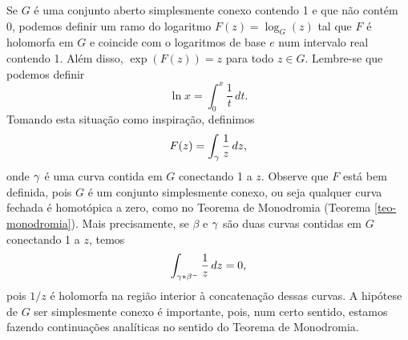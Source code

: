     Se $G$ é uma conjunto aberto simplesmente conexo contendo 1 e que não contém 0,
    podemos definir um ramo do logaritmo $F(z) = \log_G(z)$ tal que $F$ é holomorfa 
    em $G$ e coincide com o logaritmos de base $e$ num intervalo real contendo 1. 
    Além disso, $\exp(F(z)) = z$ para todo $z \in G$. Lembre-se que podemos definir
    \begin{equation*}
        \ln{x} = \int_{0}^{x}\frac{1}{t} \, dt.
    \end{equation*}    
    Tomando esta situação como inspiração, definimos
    \begin{equation*}
        F(z) = \int_\gamma \frac{1}{z} \, dz,
    \end{equation*}
    onde $\gamma$ é uma curva contida em $G$ conectando 1 a $z$. Observe que $F$ está 
    bem definida, pois $G$ é um conjunto simplesmente conexo, ou seja qualquer 
    curva fechada é homotópica a zero, como no Teorema de Monodromia 
    (Teorema \ref{teo-monodromia}). Mais precisamente, se $\beta$ e $\gamma$ são 
    duas curvas contidas em $G$ conectando 1 a $z$, temos
    \begin{equation*}
        \int_{\gamma * \beta^-} \frac{1}{z} \, dz = 0,
    \end{equation*}    
    pois $1/z$ é holomorfa na região interior à concatenação dessas curvas. A hipótese de $G$ ser simplesmente conexo é importante, pois, num certo sentido, estamos fazendo continuações analíticas no sentido do Teorema de Monodromia.
    
